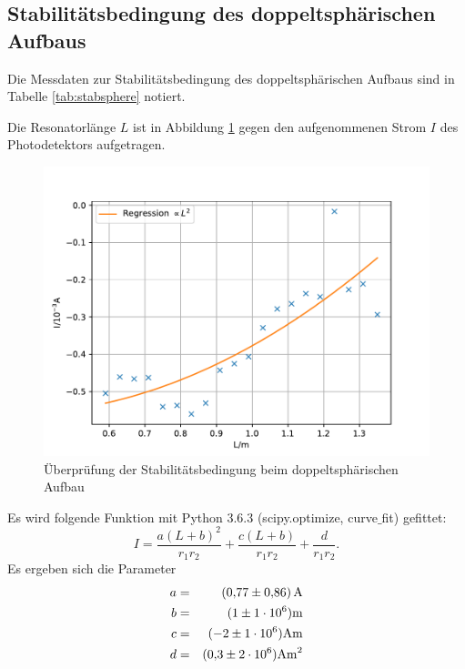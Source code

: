 \subsection{Stabilitätsbedingung des doppeltsphärischen Aufbaus}
Die Messdaten zur Stabilitätsbedingung des doppeltsphärischen Aufbaus sind in Tabelle \ref{tab:stabsphere} notiert.

Die Resonatorlänge $L$ ist in Abbildung \ref{fig:stabsphere} gegen den aufgenommenen Strom $I$ des Photodetektors aufgetragen.
\begin{figure}
  \centering
  \includegraphics[width=\textwidth]{stabsphere.pdf}
  \caption{Überprüfung der Stabilitätsbedingung beim doppeltsphärischen Aufbau}
  \label{fig:stabsphere}
\end{figure}
Es wird folgende Funktion mit Python 3.6.3 (scipy.optimize, curve$\_$fit) gefittet:
\begin{equation*}
  I= \frac{a(L+b)^2}{r_1 r_2}+\frac{c(L+b)}{r_1 r_2}+\frac{d}{r_1 r_2}.
\end{equation*}
Es ergeben sich die Parameter
\begin{align*}
a &=& \SI{  0.77   \pm 0.86 }{A} \\
b &=&(\SI{  1  }{} \pm \SI{1e+06 }{}) \si{m} \\
c &=&(\SI{ -2  }{} \pm \SI{1e+06 }{}) \si{Am} \\
d &=&(\SI{  0.3}{} \pm \SI{2e+06 }{}) \si{Am^2} \\
\end{align*}
%
%
\FloatBarrier

